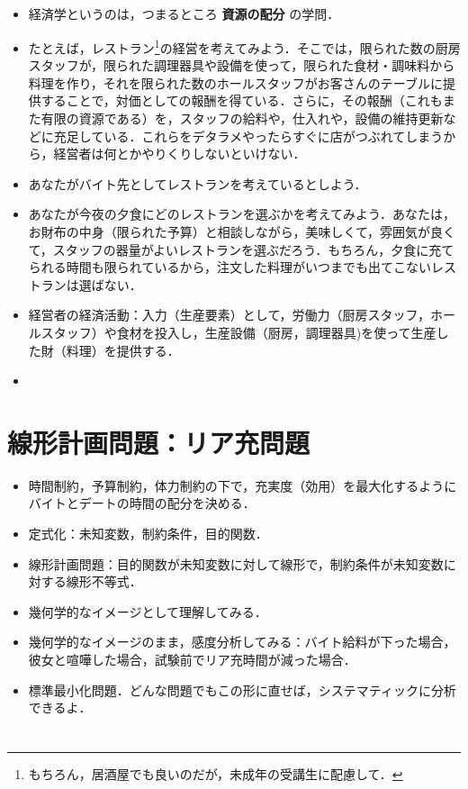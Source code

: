 \documentclass[platex,12pt,a4paper]{jsarticle}
\begin{document}
\subsection{}
\label{sec:org774f0fd}
\subsection{}
\label{sec:org42c7f4a}
\begin{itemize}
\item 経済学というのは，つまるところ \textbf{\textbf{資源の配分}} の学問．
\item たとえば，レストラン\footnote{もちろん，居酒屋でも良いのだが，未成年の受講生に配慮して．}の経営を考えてみよう．そこでは，限られた数の厨房スタッフが，限られた調理器具や設備を使って，限られた食材・調味料から料理を作り，それを限られた数のホールスタッフがお客さんのテーブルに提供することで，対価としての報酬を得ている．さらに，その報酬（これもまた有限の資源である）を，スタッフの給料や，仕入れや，設備の維持更新などに充足している．これらをデタラメやったらすぐに店がつぶれてしまうから，経営者は何とかやりくりしないといけない．
\item あなたがバイト先としてレストランを考えているとしよう．
\item あなたが今夜の夕食にどのレストランを選ぶかを考えてみよう．あなたは，お財布の中身（限られた予算）と相談しながら，美味しくて，雰囲気が良くて，スタッフの器量がよいレストランを選ぶだろう．もちろん，夕食に充てられる時間も限られているから，注文した料理がいつまでも出てこないレストランは選ばない．
\item 経営者の経済活動：入力（生産要素）として，労働力（厨房スタッフ，ホールスタッフ）や食材を投入し，生産設備（厨房，調理器具)を使って生産した財（料理）を提供する．
\item 
\end{itemize}
\section{線形計画問題：リア充問題}
\label{sec:orgfc145f6}
\begin{itemize}
\item 時間制約，予算制約，体力制約の下で，充実度（効用）を最大化するようにバイトとデートの時間の配分を決める．
\item 定式化：未知変数，制約条件，目的関数．
\item 線形計画問題：目的関数が未知変数に対して線形で，制約条件が未知変数に対する線形不等式．
\item 幾何学的なイメージとして理解してみる．
\item 幾何学的なイメージのまま，感度分析してみる：バイト給料が下った場合，彼女と喧嘩した場合，試験前でリア充時間が減った場合．
\item 標準最小化問題．どんな問題でもこの形に直せば，システマティックに分析できるよ．
\end{itemize}
\section{}
\label{sec:orgaf585c7}

\section{}
\label{sec:orgeeef415}
\end{document}
